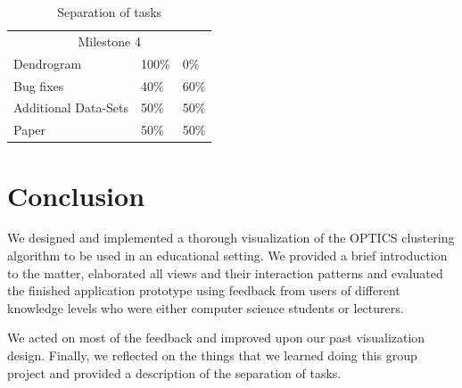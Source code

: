 \documentclass{vgtc} %
\begin{document}
\begin{table}[t]
\begin{tabular}{@{} p{4cm}p{1cm}p{1cm} @{}}
        \multicolumn{3}{c}{\cellcolor[HTML]{EFEFEF}Milestone 4}\\

        Dendrogram & 100\% & 0\%\\
        Bug fixes & 40\% & 60\%\\
        Additional Data-Sets & 50\% & 50\%\\
        Paper & 50\% & 50\%
    \end{tabular}
    \caption{Separation of tasks}
    \label{tab:work}
\end{table}

\FloatBarrier

\section{Conclusion}

We designed and implemented a thorough visualization of the OPTICS clustering
algorithm to be used in an educational setting. We provided a brief
introduction to the matter, elaborated all views and their interaction patterns
and evaluated the finished application prototype using feedback from users of
different knowledge levels who were either computer science students or
lecturers.

We acted on most of the feedback and improved upon our past visualization
design. Finally, we reflected on the things that we learned doing this group
project and provided a description of the separation of tasks.

%

%
%
%


\end{document}
